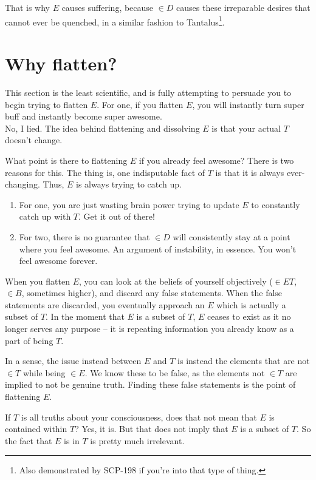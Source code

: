 \documentclass{article}
\begin{document}
That is why $E$ causes suffering, because $\in D$ causes these irreparable
desires that cannot ever be quenched, in a similar fashion to
Tantalus\footnote{Also demonstrated by SCP-198 if you're into that type of
thing.}.

\section{Why flatten?}

This section is the least scientific, and is fully attempting to persuade you to
begin trying to flatten $E$. For one, if you flatten $E$, you will instantly
turn super buff and instantly become super awesome. \\

\noindent No, I lied. The idea behind flattening and dissolving $E$ is that your
actual $T$ doesn't change.

What point is there to flattening $E$ if you already feel awesome? There is two
reasons for this. The thing is, one indisputable fact of $T$ is that it is
always ever-changing. Thus, $E$ is always trying to catch up.

\begin{enumerate}
\item For one, you are just wasting brain power trying to update $E$ to
    constantly catch up with $T$. Get it out of there!

\item For two, there is no guarantee that $\in D$ will consistently stay at a
    point where you feel awesome. An argument of instability, in essence. You
    won't feel awesome forever.
\end{enumerate}

When you flatten $E$, you can look at the beliefs of yourself objectively ($\in
ET$, $\in B$, sometimes higher), and discard any false statements. When the
false statements are discarded, you eventually approach an $E$ which is
actually a subset of $T$. In the moment that $E$ is a subset of $T$, $E$ ceases
to exist as it no longer serves any purpose -- it is repeating information you
already know as a part of being $T$.

In a sense, the issue instead between $E$ and $T$ is instead the elements that
are not $\in T$ while being $\in E$. We know these to be false, as the elements
not $\in T$ are implied to not be genuine truth. Finding these false statements
is the point of flattening $E$.

If $T$ is all truths about your consciousness, does that not mean that $E$ is
contained within $T$? Yes, it is. But that does not imply that $E$ is a subset
of $T$. So the fact that $E$ is in $T$ is pretty much irrelevant.
\end{document}
